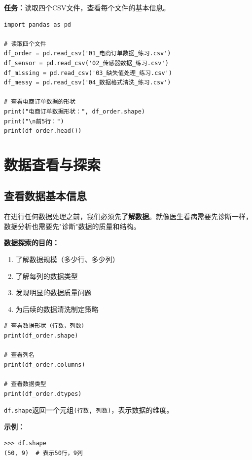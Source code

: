 \documentclass[12pt,a4paper]{article}
\begin{document}
\begin{practicebox}
\textbf{任务：}读取四个CSV文件，查看每个文件的基本信息。

\begin{lstlisting}
import pandas as pd

# 读取四个文件
df_order = pd.read_csv('01_电商订单数据_练习.csv')
df_sensor = pd.read_csv('02_传感器数据_练习.csv')
df_missing = pd.read_csv('03_缺失值处理_练习.csv')
df_messy = pd.read_csv('04_数据格式清洗_练习.csv')

# 查看电商订单数据的形状
print("电商订单数据形状：", df_order.shape)
print("\n前5行：")
print(df_order.head())
\end{lstlisting}
\end{practicebox}

\section{数据查看与探索}

\subsection{查看数据基本信息}

\begin{theorybox}[为什么需要先查看数据？]
在进行任何数据处理之前，我们必须先\textbf{了解数据}。就像医生看病需要先诊断一样，数据分析也需要先"诊断"数据的质量和结构。

\textbf{数据探索的目的：}
\begin{enumerate}
    \item 了解数据规模（多少行、多少列）
    \item 了解每列的数据类型
    \item 发现明显的数据质量问题
    \item 为后续的数据清洗制定策略
\end{enumerate}
\end{theorybox}

\begin{lstlisting}[caption={查看数据形状和列名}]
# 查看数据形状（行数，列数）
print(df_order.shape)

# 查看列名
print(df_order.columns)

# 查看数据类型
print(df_order.dtypes)
\end{lstlisting}

\begin{knowledgebox}[shape属性的含义]
\texttt{df.shape}返回一个元组\texttt{(行数, 列数)}，表示数据的维度。

\textbf{示例：}
\begin{verbatim}
>>> df.shape
(50, 9)  # 表示50行，9列
\end{verbatim}
\end{knowledgebox}
\end{document}
